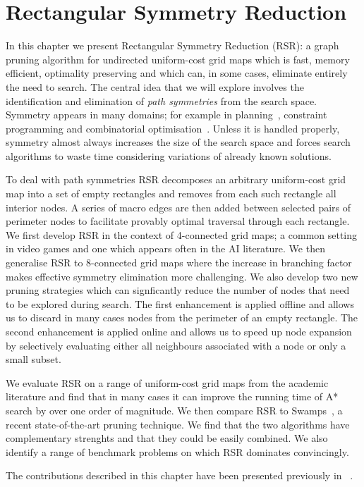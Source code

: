 \chapter{Rectangular Symmetry Reduction}
\label{cha:rsr} In this chapter we present Rectangular Symmetry Reduction (RSR): a graph pruning
algorithm for undirected uniform-cost grid maps which is fast, memory efficient,
optimality preserving and which can, in some cases, eliminate entirely the need
to search.  The central idea that we will explore involves the identification
and elimination of \emph{path symmetries} from the search space. 
Symmetry appears in many domains; for example in planning~\citep{fox99}, constraint 
programming \citep{walsh07} and combinatorial optimisation~\citep{fukunaga08}. 
Unless it is handled properly, symmetry almost always 
increases the size of the search space and forces search algorithms to waste time
considering variations of already known solutions.
\par
To deal with path symmetries RSR decomposes an arbitrary uniform-cost grid map
into a set of empty rectangles and removes from each such
rectangle all interior nodes.  A
series of macro edges are then added between selected pairs of perimeter nodes
to facilitate provably optimal traversal through each rectangle.  
We first develop RSR in the context of 4-connected grid maps; a common
setting in video games and one which appears often in the AI literature.
We then generalise RSR to 8-connected grid maps where the increase in
branching factor makes effective symmetry elimination more challenging. 
We also develop two new pruning strategies which can signficantly
reduce the number of nodes that need to be explored during search. 
The first enhancement is applied offline and allows us to discard in many cases 
nodes from the perimeter of an empty rectangle. The second enhancement is
applied online and allows us to speed up node expansion by selectively
evaluating either all neighbours associated with a node or only a small subset.

We evaluate RSR on a range of uniform-cost grid maps from the academic literature and find
that in many cases it can improve the running time of A* search by over one order of 
magnitude. We then compare RSR to Swamps~\citep{pochter10}, a recent state-of-the-art
pruning technique. We find that the two algorithms have complementary strenghts and that they
could be easily combined. We also identify a range of benchmark problems on which RSR 
dominates convincingly.  
\par

The contributions described in this chapter have been presented previously in
~\citep{harabor10,harabor11a,harabor11c}.

